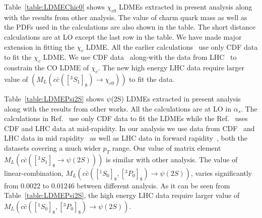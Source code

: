 \documentclass[12pt,a4paper,final]{iopart}
\newcommand{\barc}{{\bar{c}}}
\begin{document}




Table~\ref{table:LDMEChic0} shows $\chi_{c0}$ LDMEs extracted in present analysis along with the results from other
analysis. The value of charm quark mass as well as the PDFs used in the calculations are also shown in the table.
The short distance calculations are at LO except the last row in the table. We have made major extension in fitting
the $\chi_{c}$ LDME. All the earlier calculations~\cite{Cho:1995vh,Braaten:1999qk,Sharma:2012dy} use only CDF data to
fit the $\chi_{c}$ LDME. We use CDF data~\cite{Abe:1997yz} along-with the data from LHC~\cite{ATLAS:2014ala,Chatrchyan:2012ub,Aaij:2013dja} 
to constrain the CO LDME of $\chi_{c}$. The new high energy LHC data require larger value of $(M_{L}(c\barc([^3S_1]_{8})\rightarrow \chi_{c0}))$ to fit the data.  

Table~\ref{table:LDMEPsi2S} shows $\psi$(2S) LDMEs extracted in present analysis along with the results from other 
works. All the calculations are at LO in $\alpha_{s}$. The calculations in Ref.~\cite{Cho:1995vh,Braaten:1999qk,Beneke:1996yw} use only 
CDF data to fit the LDMEs while the Ref.~\cite{Sharma:2012dy} uses CDF and LHC data at mid-rapidity. In our analysis we use data from
CDF~\cite{Abe:1997jz,Acosta:2004yw} and LHC data in mid rapidity~\cite{Chatrchyan:2011kc,Khachatryan:2015rra,Aad:2015duc} as well 
as LHC data in forward rapidity~\cite{Aaij:2012ag}, both the datasets covering a much wider $p_T$ range. Our value of matrix 
element $M_{L}(c\barc([^3S_1]_{8}\rightarrow \psi(2S)))$ is similar with other analysis. The value of linear-combination, 
$M_{L}(c\barc([^1S_0]_{8},[^3P_0]_{8})\rightarrow \psi(2S))$, varies significantly from 0.0022 to
0.01246 between different analysis. As it can be seen from Table~\ref{table:LDMEPsi2S}, the high energy LHC data require larger value of
$M_{L}(c\barc([^1S_0]_{8},[^3P_0]_{8})\rightarrow \psi(2S))$.    
\end{document}
